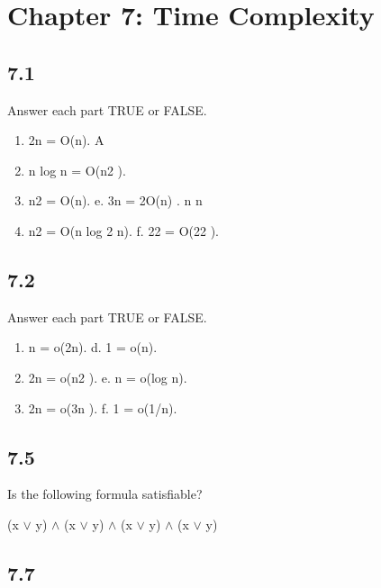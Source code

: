\section*{Chapter 7: Time Complexity}

\subsection*{7.1}

Answer each part TRUE or FALSE.

\begin{enumerate}[label=(\alph*), leftmargin=2.5em]

\item 2n = O(n). A

\item n log n = O(n2 ).

\item n2 = O(n). e. 3n = 2O(n) . n n

\item n2 = O(n log 2 n). f. 22 = O(22 ).

\end{enumerate}


\subsection*{7.2}

Answer each part TRUE or FALSE.

\begin{enumerate}[label=(\alph*), leftmargin=2.5em]

\item n = o(2n). d. 1 = o(n).

\item 2n = o(n2 ). e. n = o(log n).

\item 2n = o(3n ). f. 1 = o(1/n).

\end{enumerate}


\subsection*{7.5}

Is the following formula satisfiable?

(x $\lor$ y) $\land$ (x $\lor$ y) $\land$ (x $\lor$ y) $\land$ (x $\lor$ y)


\subsection*{7.7}

